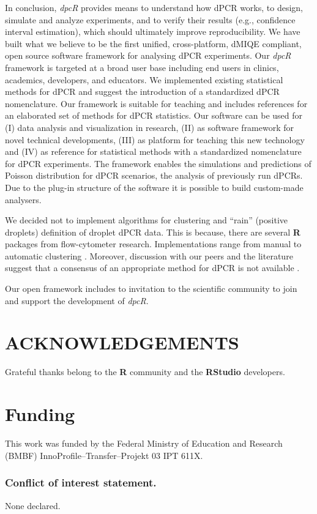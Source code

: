 \documentclass[a4,center,fleqn]{NAR}
\begin{document}
In conclusion, \textit{dpcR} provides means to understand how dPCR works, to 
design, simulate and analyze experiments, and to verify their results (e.g., 
confidence interval estimation), which should ultimately improve 
reproducibility. We have built what we believe to be the first unified, 
cross-platform, dMIQE compliant, open source software framework for analysing 
dPCR experiments. Our \textit{dpcR} framework is targeted at a broad user base 
including end users in clinics, academics, developers, and educators. We 
implemented existing statistical methods for dPCR and suggest the introduction 
of a standardized dPCR nomenclature. Our framework is suitable for teaching and 
includes references for an elaborated set of methods for dPCR statistics. Our 
software can be used for (I) data analysis and visualization in research, (II) 
as software framework for novel technical developments, (III) as platform for 
teaching this new technology and (IV) as reference for statistical methods with 
a standardized nomenclature for dPCR experiments. The framework enables the 
simulations and predictions of Poisson distribution for dPCR scenarios, the 
analysis of previously run dPCRs. Due to the plug-in structure of the software 
it is possible to build custom-made analysers.

We decided not to implement algorithms for clustering and ``rain'' (positive 
droplets) definition of droplet dPCR data. This is because, there are several 
\textbf{R} packages from flow-cytometer research. Implementations range from 
manual to automatic clustering \cite{le_meur_computational_2013, 
milbury_determining_2014, Malek15022015, trypsteen_ddpcrquant_2015}. Moreover, 
discussion with our peers and the literature suggest that a consensus of an 
appropriate method for dPCR is not available \cite{trypsteen_ddpcrquant_2015}.

Our open framework includes to invitation to the scientific community to join 
and support the development of \textit{dpcR}.


\section{ACKNOWLEDGEMENTS}

Grateful thanks belong to the \textbf{R} community and the \textbf{RStudio} 
developers.

\section{Funding}
This work was funded by the Federal Ministry of Education and Research (BMBF) 
InnoProfile--Transfer--Projekt 03 IPT 611X.

\subsubsection{Conflict of interest statement.} None declared.



\end{document}
